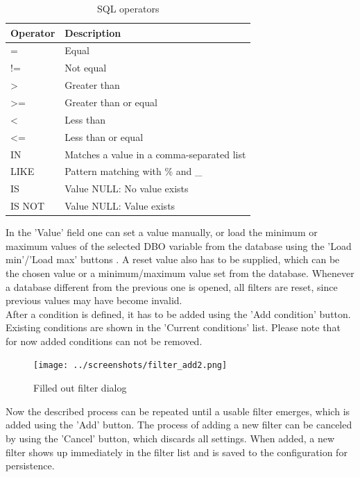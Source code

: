 \begin{table}[H]
  \center
  \begin{tabular}{ | l | l |}
    \hline
    \textbf{Operator} & \textbf{Description} \\ \hline
    = & Equal \\ \hline
    != & Not equal \\ \hline
    > & Greater than \\ \hline
    >= & Greater than or equal \\ \hline
    < & Less than \\ \hline
    <= & Less than or equal \\ \hline
    IN & Matches a value in a comma-separated list \\ \hline
    LIKE & Pattern matching with \% and \_ \\ \hline
    IS & Value NULL: No value exists \\ \hline
    IS NOT & Value NULL: Value exists \\
    \hline
  \end{tabular}
  \caption{SQL operators}
\end{table}

In the 'Value' field one can set a value manually, or load the minimum or maximum values of the selected DBO variable from the database using the 'Load min'/'Load max' buttons . A reset value also has to be supplied, which can be the chosen value or a minimum/maximum value set from the database.  Whenever a database different from the previous one is opened, all filters are reset, since previous values may have become invalid.\\

After a condition is defined, it has to be added using the 'Add condition' button. Existing conditions are shown in the 'Current conditions' list. Please note that for now added conditions can not be removed.

\begin{figure}[H]
  \center
    \texttt{[image: ../screenshots/filter\_add2.png]}
  \caption{Filled out filter dialog}
  \label{fig:filter_add2}
\end{figure}

Now the described process can be repeated until a usable filter emerges, which is added using the 'Add'
button. The process of adding a new filter can be canceled by using the 'Cancel' button, which discards all
settings. When added, a new filter shows up immediately in the filter list and is saved to the configuration
for persistence.


